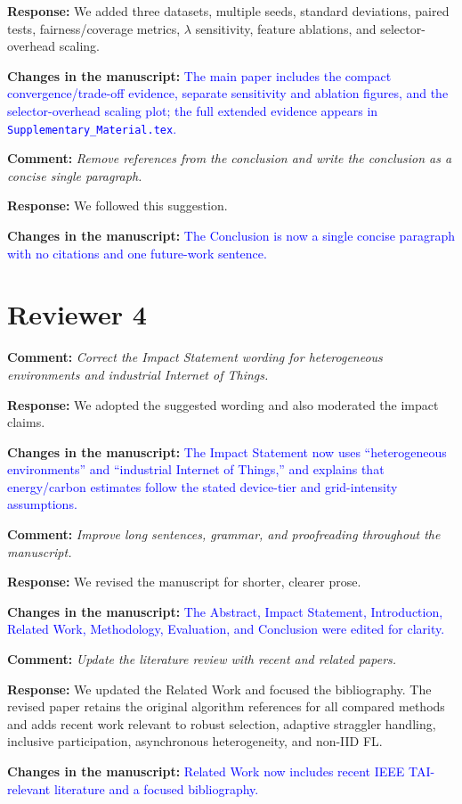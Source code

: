 \documentclass[11pt]{article}
\newcommand{\comment}[1]{\textbf{Comment:} \textit{#1}}
\newcommand{\response}[1]{\textbf{Response:} #1}
\newcommand{\change}[1]{\textbf{Changes in the manuscript:} \textcolor{blue}{#1}}
\begin{document}
\response{We added three datasets, multiple seeds, standard deviations, paired tests, fairness/coverage metrics, $\lambda$ sensitivity, feature ablations, and selector-overhead scaling.}

\change{The main paper includes the compact convergence/trade-off evidence, separate sensitivity and ablation figures, and the selector-overhead scaling plot; the full extended evidence appears in \texttt{Supplementary\_Material.tex}.}

\comment{Remove references from the conclusion and write the conclusion as a concise single paragraph.}

\response{We followed this suggestion.}

\change{The Conclusion is now a single concise paragraph with no citations and one future-work sentence.}

\section*{Reviewer 4}

\comment{Correct the Impact Statement wording for heterogeneous environments and industrial Internet of Things.}

\response{We adopted the suggested wording and also moderated the impact claims.}

\change{The Impact Statement now uses ``heterogeneous environments'' and ``industrial Internet of Things,'' and explains that energy/carbon estimates follow the stated device-tier and grid-intensity assumptions.}

\comment{Improve long sentences, grammar, and proofreading throughout the manuscript.}

\response{We revised the manuscript for shorter, clearer prose.}

\change{The Abstract, Impact Statement, Introduction, Related Work, Methodology, Evaluation, and Conclusion were edited for clarity.}

\comment{Update the literature review with recent and related papers.}

\response{We updated the Related Work and focused the bibliography. The revised paper retains the original algorithm references for all compared methods and adds recent work relevant to robust selection, adaptive straggler handling, inclusive participation, asynchronous heterogeneity, and non-IID FL.}

\change{Related Work now includes recent IEEE TAI-relevant literature and a focused bibliography.}
\end{document}
